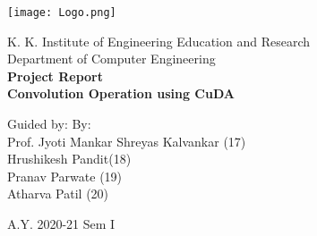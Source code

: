 \begin{titlepage}
    \begin{center}
        \begin{center}
             \texttt{[image: Logo.png]}
        \end{center}
        \Large
        K. K. Institute of Engineering Education and Research\\
        Department of Computer Engineering\\
        \vspace{0.5 in}
        \Huge
        \textbf{Project Report}\\
        \vspace*{0.5 in}
        \Large
        \textbf{Convolution Operation using CuDA}
        \vspace{1 in}
                
        \Large
        Guided by:                  \hfill                 By: \hspace*{1.35in} \\
        Prof. Jyoti Mankar     \hfill           Shreyas Kalvankar (17)\\
        				\hspace{2.95 in}			 Hrushikesh Pandit(18)\\
        				\hspace{2.8 in}			 Pranav Parwate (19)\\
        				\hspace{2.55 in}			 Atharva Patil (20)\\
        
        \vspace*{1 in}
        
        A.Y. 2020-21 Sem I
    \end{center}
\end{titlepage}